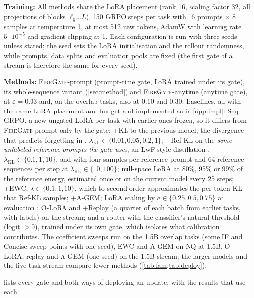 \documentclass{article}
\theoremstyle{plain}
\theoremstyle{definition}
\theoremstyle{remark}
\renewcommand{\lg}{\ell_{\mathrm{g}}}
\newcommand{\methodp}{\textsc{FireGate}-prompt}
\newcommand{\methoda}{\textsc{FireGate}-anytime}
\begin{document}
\textbf{Training:} All methods share the LoRA placement (rank 16, scaling factor 32, all projections of blocks
$\lg..L$), 150 GRPO steps per task with 16 prompts $\times$ 8 samples at temperature 1, at most 512 new tokens,
AdamW with learning rate $5\cdot10^{-5}$ and gradient clipping at 1. Each configuration is run with three seeds
unless stated; the seed sets the LoRA initialisation and the rollout randomness, while prompts, data splits and
evaluation pools are fixed (the first gate of a stream is therefore the same for every seed).

\textbf{Methods:} \methodp{} (prompt-time gate, LoRA trained under its gate), its whole-sequence variant
(\cref{sec:method}) and \methoda{} (anytime gate), at $\varepsilon=0.03$ and, on the overlap tasks, also at $0.10$
and $0.30$. Baselines, all with the same LoRA placement and budget and implemented as in \cref{app:impl}:
Seq-GRPO, a new ungated LoRA per task with earlier ones frozen, so it differs from \methodp{} only by the gate;
+KL to the previous model, the divergence that predicts forgetting in \citet{shenfeld2026razor},
$\lambda_{\mathrm{KL}}\in\{0.01,0.05,0.2,1\}$; +Ref-KL on the \emph{same unlabeled reference prompts the gate
uses}, an LwF-style distillation \citep{li2018lwf}, $\lambda_{\mathrm{KL}}\in\{0.1,1,10\}$, and with four samples per
reference prompt and 64 reference sequences per step at $\lambda_{\mathrm{KL}}\in\{10,100\}$; null-space LoRA
at 80\%, 95\% or 99\% of the reference energy, estimated once or on the current model every 25 steps;
+EWC, $\lambda\in\{0.1,1,10\}$, which to second order approximates the per-token KL that Ref-KL samples;
+A-GEM; LoRA scaling by $a\in\{0.25,0.5,0.75\}$ at evaluation \citep{wortsman2022robust};
O-LoRA and +Replay (a quarter of each batch from earlier tasks, with labels) on the stream; and a
router with the classifier's natural threshold (logit $>0$), trained under its own gate, which isolates what
calibration contributes. The coefficient sweeps run on the 1.5B overlap tasks (some IF and Concise sweep points with
one seed), EWC and A-GEM on NQ at 1.5B, O-LoRA, replay and A-GEM (one seed) on the 1.5B stream; the larger models and the five-task
stream compare fewer methods (\cref{tab:fam,tab:deploy}).

 lists every gate and both ways of deploying an update, with the results that use each.
\end{document}
